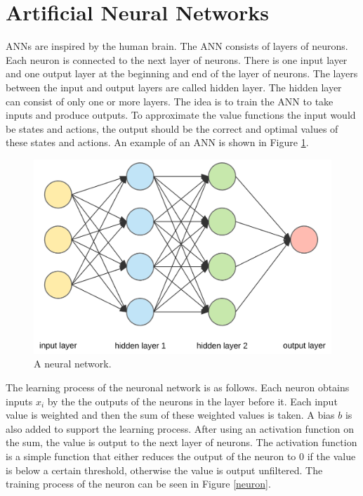 \section{Artificial Neural Networks}

ANNs are inspired by the human brain. 
The ANN consists of layers of neurons. Each neuron is connected to the next layer of neurons. There is one input layer and one output layer at the beginning and end of the layer of neurons. The layers between the input and output layers are called hidden layer. The hidden layer can consist of only one or more layers. The idea is to train the ANN to take inputs and produce outputs. To approximate the value functions the input would be states and actions, the output should be the correct and optimal values of these states and actions. An example of an ANN is shown in Figure \ref{neuralnet}.

\begin{figure} [h]
	\centering
	\includegraphics[width=1\textwidth]{figures/neural_network.png}
	\caption{A neural network. \cite{neural_networkpng}}
	\label{neuralnet}
\end{figure}

\vspace{0.5cm}

The learning process of the neuronal network is as follows. Each neuron obtains inputs $x_i$ by the the outputs of the neurons in the layer before it. Each input value is weighted and then the sum of these weighted values is taken. A bias $b$ is also added to support the learning process. After using an activation function on the sum, the value is output to the next layer of neurons. The activation function is a simple function that either reduces the output of the neuron to 0 if the value is below a certain threshold, otherwise the value is output unfiltered.
The training process of the neuron can be seen in Figure \ref{neuron}.

